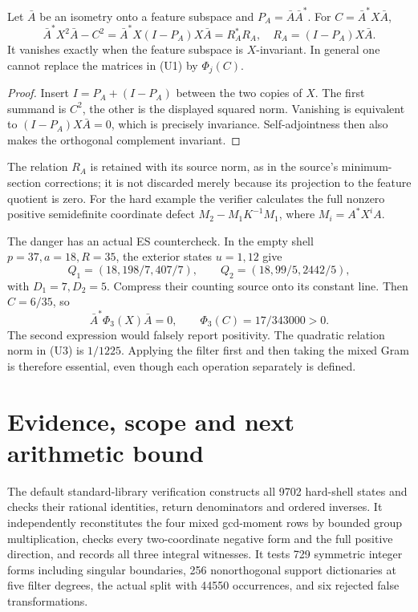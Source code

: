 \begin{theorem}
Let $\bar A$ be an isometry onto a feature subspace and $P_A=\bar A\bar A^*$.
For $C=\bar A^*X\bar A$,
\[
 \boxed{\bar A^*X^2\bar A-C^2
 =\bar A^*X(I-P_A)X\bar A
 =R_A^*R_A,\quad R_A=(I-P_A)X\bar A.}\tag{U3}
\]
It vanishes exactly when the feature subspace is $X$-invariant. In general
one cannot replace the matrices in (U1) by $\Phi_j(C)$.
\end{theorem}
\begin{proof}
Insert $I=P_A+(I-P_A)$ between the two copies of $X$. The first summand is
$C^2$, the other is the displayed squared norm. Vanishing is equivalent to
$(I-P_A)X\bar A=0$, which is precisely invariance. Self-adjointness then
also makes the orthogonal complement invariant.
\end{proof}
The relation $R_A$ is retained with its source norm, as in the source's
minimum-section corrections; it is not discarded merely because its
projection to the feature quotient is zero. For the hard example the verifier
calculates the full nonzero positive semidefinite coordinate defect
$M_2-M_1K^{-1}M_1$, where $M_i=A^*X^iA$.

The danger has an actual ES countercheck. In the empty shell
$p=37,a=18,R=35$, the exterior states $u=1,12$ give
\[
 Q_1=(18,198/7,407/7),\qquad Q_2=(18,99/5,2442/5),
\]
with $D_1=7,D_2=5$. Compress their counting source onto its constant line.
Then $C=6/35$, so
\[
 \boxed{\bar A^*\Phi_3(X)\bar A=0,
 \qquad \Phi_3(C)=17/343000>0.}\tag{U4}
\]
The second expression would falsely report positivity. The quadratic relation
norm in (U3) is $1/1225$. Applying the filter first and then taking the mixed
Gram is therefore essential, even though each operation separately is defined.

\section{Evidence, scope and next arithmetic bound}
The default standard-library verification constructs all 9702 hard-shell
states and checks their rational identities, return denominators and ordered
inverses. It independently reconstitutes the four mixed gcd-moment rows by
bounded group multiplication, checks every two-coordinate negative form and
the full positive direction, and records all three integral witnesses.
It tests 729 symmetric integer forms including singular boundaries, 256
nonorthogonal support dictionaries at five filter degrees, the actual split
with 44550 occurrences, and six rejected false transformations.

